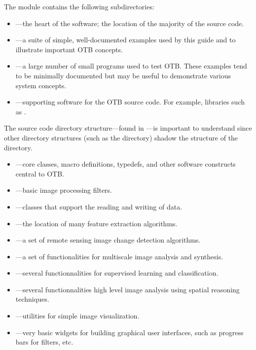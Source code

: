 The  module contains the following subdirectories:
\begin{itemize}
        \item {}---the heart of the software; the location
        of the majority of the source code.
        \item {}---a suite of simple, well-documented
        examples used by this guide and to illustrate important
        OTB concepts.
        \item {}---a large number of small programs used
        to test OTB. These examples tend to be minimally documented but may
        be useful to demonstrate various system concepts. 
        \item {}---supporting software for the OTB
        source code. For example, libraries such as .%
\end{itemize}

The source code directory structure---found in ---is 
important to understand since other directory structures (such as the
 directory) shadow the structure of the
 directory.
\begin{itemize}
        \item {}---core classes, macro definitions,
        typedefs, and other software constructs central to OTB.
        \item {}---basic image processing
        filters.
        \item {}---classes that support the reading
        and writing of data.
	\item {}---the location of many
	feature extraction algorithms.
	\item {}---a set of remote
	sensing image change detection algorithms.
	\item {}---a set of functionalities
	for multiscale image analysis and synthesis.
	\item {}---several functionnalities for
	supervised learning and classification.
	\item {}---several
	functionnalities high level image analysis using spatial
	reasoning techniques.
	\item {}---utilities for simple image
	visualization.
	\item {}---very basic widgets for building
	graphical user interfaces, such as progress bars for filters, etc.
	  
\end{itemize}


